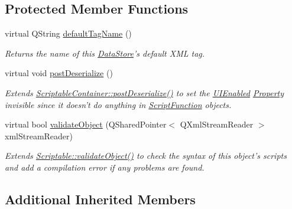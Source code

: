 \subsection*{Protected Member Functions}
\begin{DoxyCompactItemize}
\item 
virtual Q\-String \hyperlink{class_picto_1_1_analysis_function_abffd30d757e70e11c3dbbdd108c34081}{default\-Tag\-Name} ()
\begin{DoxyCompactList}\small\item\em Returns the name of this \hyperlink{class_picto_1_1_data_store}{Data\-Store}'s default X\-M\-L tag. \end{DoxyCompactList}\item 
\hypertarget{class_picto_1_1_analysis_function_a0396de92827162ab6fa084eb5c977b34}{virtual void \hyperlink{class_picto_1_1_analysis_function_a0396de92827162ab6fa084eb5c977b34}{post\-Deserialize} ()}\label{class_picto_1_1_analysis_function_a0396de92827162ab6fa084eb5c977b34}

\begin{DoxyCompactList}\small\item\em Extends \hyperlink{class_picto_1_1_scriptable_container_a0654af2c08f9a6c967a21b57614950ba}{Scriptable\-Container\-::post\-Deserialize()} to set the \hyperlink{class_picto_1_1_u_i_enabled}{U\-I\-Enabled} \hyperlink{class_picto_1_1_property}{Property} invisible since it doesn't do anything in \hyperlink{class_picto_1_1_script_function}{Script\-Function} objects. \end{DoxyCompactList}\item 
\hypertarget{class_picto_1_1_analysis_function_ae4f715e2cacddea6b80c734305dcb966}{virtual bool \hyperlink{class_picto_1_1_analysis_function_ae4f715e2cacddea6b80c734305dcb966}{validate\-Object} (Q\-Shared\-Pointer$<$ Q\-Xml\-Stream\-Reader $>$ xml\-Stream\-Reader)}\label{class_picto_1_1_analysis_function_ae4f715e2cacddea6b80c734305dcb966}

\begin{DoxyCompactList}\small\item\em Extends \hyperlink{class_picto_1_1_scriptable_ab6e2944c43a3b5d418bf7b251594386d}{Scriptable\-::validate\-Object()} to check the syntax of this object's scripts and add a compilation error if any problems are found. \end{DoxyCompactList}\end{DoxyCompactItemize}
\subsection*{Additional Inherited Members}


